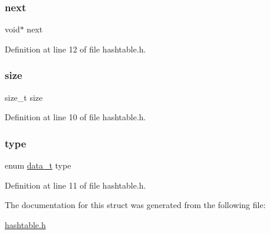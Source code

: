 \mbox{\label{structht__item_a75b19ffcca77bfc647ff02695958fd95}} 
\subsubsection{\texorpdfstring{next}{next}}
{\footnotesize\ttfamily void$\ast$ next}



Definition at line 12 of file hashtable.\+h.

\mbox{\label{structht__item_a854352f53b148adc24983a58a1866d66}} 
\subsubsection{\texorpdfstring{size}{size}}
{\footnotesize\ttfamily size\+\_\+t size}



Definition at line 10 of file hashtable.\+h.

\mbox{\label{structht__item_a0c6169f5c94682132bbbe974784559e6}} 
\subsubsection{\texorpdfstring{type}{type}}
{\footnotesize\ttfamily enum \mbox{\hyperlink{hashtable_8h_adb5f3584b941a8dc0fed6b7302b4b8eb}{data\+\_\+t}} type}



Definition at line 11 of file hashtable.\+h.



The documentation for this struct was generated from the following file\+:\begin{DoxyCompactItemize}
\item 
\mbox{\hyperlink{hashtable_8h}{hashtable.\+h}}\end{DoxyCompactItemize}
